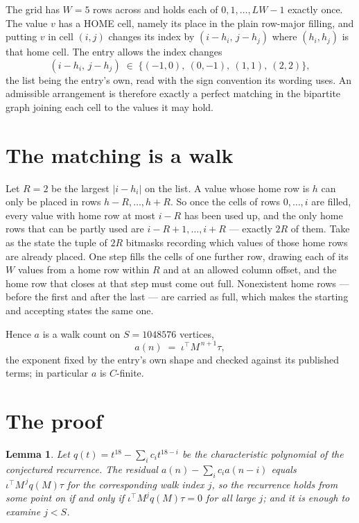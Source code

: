 \documentclass[11pt,a4paper]{article}
\theoremstyle{plain}
\newtheorem{lemma}[theorem]{Lemma}
\theoremstyle{definition}
\begin{document}
The grid has $W=5$ rows across and holds each of $0,1,\dots,LW-1$ exactly once. The value
$v$ has a HOME cell, namely its place in the plain row-major filling, and putting $v$ in cell
$(i,j)$ changes its index by $(i-h_i,\,j-h_j)$ where $(h_i,h_j)$ is that home cell. The entry
allows the index changes
\[
(i-h_i,\,j-h_j)\;\in\;\{(-1,0),\ (0,-1),\ (1,1),\ (2,2)\},
\]
the list being the entry's own, read with the sign convention its wording uses. An admissible
arrangement is therefore exactly a perfect matching in the bipartite graph joining each cell to
the values it may hold.

\section{The matching is a walk}

Let $R=2$ be the largest $|i-h_i|$ on the list. A value whose home row is $h$ can only be
placed in rows $h-R,\dots,h+R$. So once the cells of rows $0,\dots,i$ are filled, every
value with home row at most $i-R$ has been used up, and the only home rows that can be
partly used are $i-R+1,\dots,i+R$ --- exactly $2R$ of them. Take as the state the tuple of
$2R$ bitmasks recording which values of those home rows are already placed. One step fills
the cells of one further row, drawing each of its $W$ values from a home row within $R$
and at an allowed column offset, and the home row that closes at that step must come out
full. Nonexistent home rows --- before the first and after the last --- are carried as
full, which makes the starting and accepting states the same one.

Hence $a$ is a walk count on $S=1048576$ vertices,
\[
a(n)\;=\;\iota^{\!\top}M^{\,n+1}\tau ,
\]
the exponent fixed by the entry's own shape and checked against its published terms; in
particular $a$ is $C$-finite.

\section{The proof}

\begin{lemma}\label{lem:crit}
Let $q(t)=t^{18}-\sum_i c_it^{18-i}$ be the characteristic polynomial of the
conjectured recurrence. The residual $a(n)-\sum_ic_ia(n-i)$ equals
$\iota^{\!\top}M^{\,j}q(M)\tau$ for the corresponding walk index $j$, so the recurrence
holds from some point on if and only if $\iota^{\!\top}M^{j}q(M)\tau=0$ for all large $j$;
and it is enough to examine $j<S$.
\end{lemma}
\end{document}
